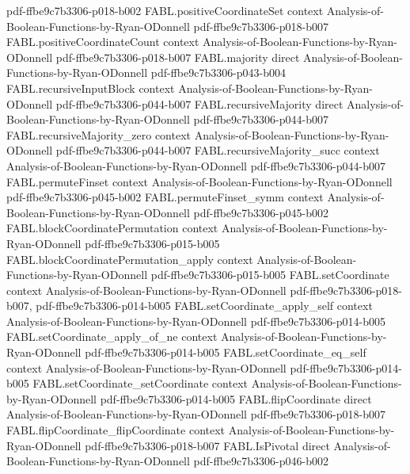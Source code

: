 \begin{theorem}
  {pdf-ffbe9c7b3306-p018-b002}
\proofstep
  {FABL.positiveCoordinateSet}
  {context}
  {Analysis-of-Boolean-Functions-by-Ryan-ODonnell}
  {pdf-ffbe9c7b3306-p018-b007}
\proofstep
  {FABL.positiveCoordinateCount}
  {context}
  {Analysis-of-Boolean-Functions-by-Ryan-ODonnell}
  {pdf-ffbe9c7b3306-p018-b007}
\proofstep
  {FABL.majority}
  {direct}
  {Analysis-of-Boolean-Functions-by-Ryan-ODonnell}
  {pdf-ffbe9c7b3306-p043-b004}
\proofstep
  {FABL.recursiveInputBlock}
  {context}
  {Analysis-of-Boolean-Functions-by-Ryan-ODonnell}
  {pdf-ffbe9c7b3306-p044-b007}
\proofstep
  {FABL.recursiveMajority}
  {direct}
  {Analysis-of-Boolean-Functions-by-Ryan-ODonnell}
  {pdf-ffbe9c7b3306-p044-b007}
\proofstep
  {FABL.recursiveMajority_zero}
  {context}
  {Analysis-of-Boolean-Functions-by-Ryan-ODonnell}
  {pdf-ffbe9c7b3306-p044-b007}
\proofstep
  {FABL.recursiveMajority_succ}
  {context}
  {Analysis-of-Boolean-Functions-by-Ryan-ODonnell}
  {pdf-ffbe9c7b3306-p044-b007}
\proofstep
  {FABL.permuteFinset}
  {context}
  {Analysis-of-Boolean-Functions-by-Ryan-ODonnell}
  {pdf-ffbe9c7b3306-p045-b002}
\proofstep
  {FABL.permuteFinset_symm}
  {context}
  {Analysis-of-Boolean-Functions-by-Ryan-ODonnell}
  {pdf-ffbe9c7b3306-p045-b002}
\proofstep
  {FABL.blockCoordinatePermutation}
  {context}
  {Analysis-of-Boolean-Functions-by-Ryan-ODonnell}
  {pdf-ffbe9c7b3306-p015-b005}
\proofstep
  {FABL.blockCoordinatePermutation_apply}
  {context}
  {Analysis-of-Boolean-Functions-by-Ryan-ODonnell}
  {pdf-ffbe9c7b3306-p015-b005}
\proofstep
  {FABL.setCoordinate}
  {context}
  {Analysis-of-Boolean-Functions-by-Ryan-ODonnell}
  {pdf-ffbe9c7b3306-p018-b007,
    pdf-ffbe9c7b3306-p014-b005}
\proofstep
  {FABL.setCoordinate_apply_self}
  {context}
  {Analysis-of-Boolean-Functions-by-Ryan-ODonnell}
  {pdf-ffbe9c7b3306-p014-b005}
\proofstep
  {FABL.setCoordinate_apply_of_ne}
  {context}
  {Analysis-of-Boolean-Functions-by-Ryan-ODonnell}
  {pdf-ffbe9c7b3306-p014-b005}
\proofstep
  {FABL.setCoordinate_eq_self}
  {context}
  {Analysis-of-Boolean-Functions-by-Ryan-ODonnell}
  {pdf-ffbe9c7b3306-p014-b005}
\proofstep
  {FABL.setCoordinate_setCoordinate}
  {context}
  {Analysis-of-Boolean-Functions-by-Ryan-ODonnell}
  {pdf-ffbe9c7b3306-p014-b005}
\proofstep
  {FABL.flipCoordinate}
  {direct}
  {Analysis-of-Boolean-Functions-by-Ryan-ODonnell}
  {pdf-ffbe9c7b3306-p018-b007}
\proofstep
  {FABL.flipCoordinate_flipCoordinate}
  {context}
  {Analysis-of-Boolean-Functions-by-Ryan-ODonnell}
  {pdf-ffbe9c7b3306-p018-b007}
\proofstep
  {FABL.IsPivotal}
  {direct}
  {Analysis-of-Boolean-Functions-by-Ryan-ODonnell}
  {pdf-ffbe9c7b3306-p046-b002}

\end{theorem}
